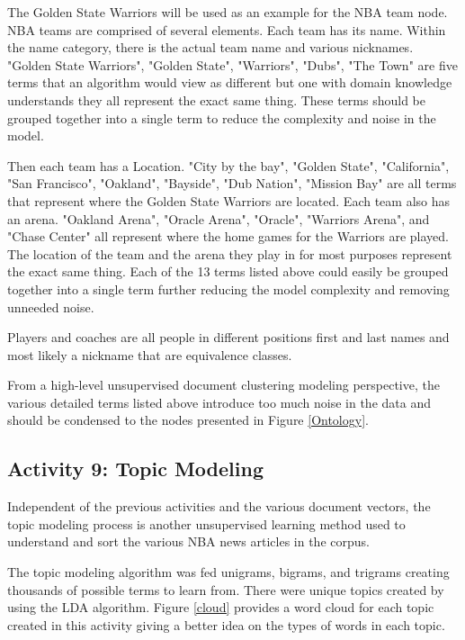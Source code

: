 \documentclass[5p,authoryear]{elsarticle}
\begin{document}
The Golden State Warriors will be used as an example for the NBA team node.
NBA teams are comprised of several elements. 
Each team has its name. 
Within the name category, there is the actual team name and various nicknames. 
"Golden State Warriors", "Golden State", "Warriors", "Dubs", "The Town" are five terms that an algorithm would view as different but one with domain knowledge understands they all represent the exact same thing. 
These terms should be grouped together into a single term to reduce the complexity and noise in the model.

Then each team has a Location. "City by the bay", "Golden State", "California", "San Francisco", "Oakland", "Bayside", "Dub Nation", "Mission Bay" are all terms that represent where the Golden State Warriors are located. Each team also has an arena. "Oakland Arena", "Oracle Arena", "Oracle", "Warriors Arena", and "Chase Center" all represent where the home games for the Warriors are played. The location of the team and the arena they play in for most purposes represent the exact same thing. Each of the 13 terms listed above could easily be grouped together into a single term further reducing the model complexity and removing unneeded noise.

Players and coaches are all people in different positions first and last names and most likely a nickname that are equivalence classes. 

From a high-level unsupervised document clustering modeling perspective, the various detailed terms listed above introduce too much noise in the data and should be condensed to the nodes presented in Figure \ref{Ontology}.



\subsection{Activity 9: Topic Modeling}\label{one}

Independent of the previous activities and the various document vectors, the topic modeling process is another unsupervised learning method used to understand and sort the various NBA news articles in the corpus.

The topic modeling algorithm was fed unigrams, bigrams, and trigrams creating thousands of possible terms to learn from.
There were  unique topics created by using the LDA algorithm.
Figure \ref{cloud} provides a word cloud for each topic created in this activity giving a better idea on the types of words in each topic.
\end{document}
